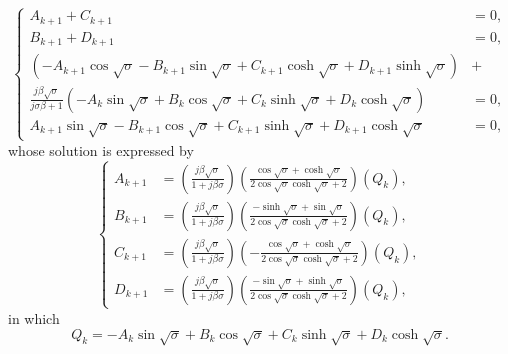 \documentclass{svjour3}                     %
\begin{document}
\begin{equation}
    \left\{\begin{aligned}
        A_{k+1} + C_{k+1} &= 0, \\
        B_{k+1} + D_{k+1} &= 0, \\
        \left( - A_{k+1} \cos{\sqrt{\sigma}} - B_{k+1} \sin{\sqrt{\sigma}} + C_{k+1} \cosh{\sqrt{\sigma}} + D_{k+1} \sinh{\sqrt{\sigma}} \right) &+ \\
        \frac{j \beta \sqrt{\sigma}}{ j\sigma \beta + 1 } \left( - A_{k} \sin{\sqrt{\sigma}} + B_{k} \cos{\sqrt{\sigma}} + C_{k} \sinh{\sqrt{\sigma}} + D_{k} \cosh{\sqrt{\sigma}} \right) &= 0, \\
        A_{k+1} \sin{\sqrt{\sigma}} - B_{k+1} \cos{\sqrt{\sigma}} + C_{k+1} \sinh{\sqrt{\sigma}} + D_{k+1} \cosh{\sqrt{\sigma}} &= 0,
    \end{aligned}\right.
\end{equation}
whose solution is expressed by
\begin{equation}
    \left\{\begin{aligned}
        A_{k+1} &= \left( \frac{j \beta \sqrt{\sigma }}{1+j \beta \sigma } \right) \left(\frac{\cos\sqrt{\sigma }+\cosh\sqrt{\sigma }}{2 \cos\sqrt{\sigma }\cosh\sqrt{\sigma }+2} \right) \left( Q_k \right), \\
        B_{k+1} &= \left( \frac{j \beta \sqrt{\sigma }}{1+j \beta \sigma } \right) \left( \frac{-\sinh\sqrt{\sigma }+\sin\sqrt{\sigma }}{2 \cos\sqrt{\sigma }\cosh\sqrt{\sigma }+2} \right) \left( Q_k \right), \\
        C_{k+1} &= \left( \frac{j \beta \sqrt{\sigma }}{1+j \beta \sigma } \right) \left( -\frac{\cos\sqrt{\sigma }+\cosh\sqrt{\sigma }}{2 \cos\sqrt{\sigma } \cosh\sqrt{\sigma }+2} \right) \left( Q_k \right), \\
        D_{k+1} &= \left( \frac{j \beta \sqrt{\sigma }}{1+j \beta \sigma } \right) \left( \frac{-\sin\sqrt{\sigma }+\sinh\sqrt{\sigma }}{2 \cos\sqrt{\sigma }\cosh\sqrt{\sigma }+2} \right) \left( Q_k \right), 
    \end{aligned}\right.
\end{equation}
in which
\begin{equation}
    Q_k = - A_{k} \sin{\sqrt{\sigma}} + B_{k} \cos{\sqrt{\sigma}} + C_{k} \sinh{\sqrt{\sigma}} + D_{k} \cosh{\sqrt{\sigma}}.
\end{equation}
\end{document}
